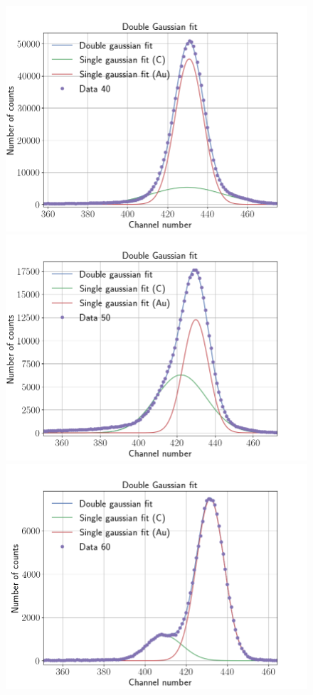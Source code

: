 \begin{figure}
\centering
\includegraphics[width=0.99\columnwidth]{Data_40}
\includegraphics[width=0.99\columnwidth]{Data_50}
\includegraphics[width=0.99\columnwidth]{Data_60}

\end{figure}
